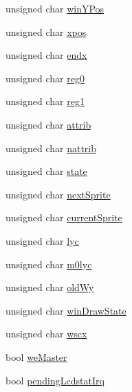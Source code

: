 \begin{DoxyCompactItemize}
unsigned char \hyperlink{structgambatte_1_1SaveState_1_1PPU_abbc3b3a5d9961bcff5f1c58cb11099c7}{win\+Y\+Pos}
\item 
unsigned char \hyperlink{structgambatte_1_1SaveState_1_1PPU_a4cede5d88c31db884c02ec5547ae8ceb}{xpos}
\item 
unsigned char \hyperlink{structgambatte_1_1SaveState_1_1PPU_abe2c9145e622b8e99ff87ceedb8baeff}{endx}
\item 
unsigned char \hyperlink{structgambatte_1_1SaveState_1_1PPU_a84648df39d301ca942bc50a36dfe1dd3}{reg0}
\item 
unsigned char \hyperlink{structgambatte_1_1SaveState_1_1PPU_a8bd8169b9a763c17bd15c3c9c5866f0c}{reg1}
\item 
unsigned char \hyperlink{structgambatte_1_1SaveState_1_1PPU_a500021f50efc515f9bbf7cabd0a77a6b}{attrib}
\item 
unsigned char \hyperlink{structgambatte_1_1SaveState_1_1PPU_a8b27a2b9ab5953c02ba735ff5d7f197a}{nattrib}
\item 
unsigned char \hyperlink{structgambatte_1_1SaveState_1_1PPU_a2ad525914659c6e55440272352d20355}{state}
\item 
unsigned char \hyperlink{structgambatte_1_1SaveState_1_1PPU_a0188cf3be86c6b4338fcfea215089374}{next\+Sprite}
\item 
unsigned char \hyperlink{structgambatte_1_1SaveState_1_1PPU_a2a76d262159b270c5a3359bd8bef8fb3}{current\+Sprite}
\item 
unsigned char \hyperlink{structgambatte_1_1SaveState_1_1PPU_acb7f03d9e87fb73d89688ea2d8789abe}{lyc}
\item 
unsigned char \hyperlink{structgambatte_1_1SaveState_1_1PPU_a25f14433cb1ac9997c84af8fbfb51962}{m0lyc}
\item 
unsigned char \hyperlink{structgambatte_1_1SaveState_1_1PPU_a46bc471457cfdef2e53a362fb9929bf5}{old\+Wy}
\item 
unsigned char \hyperlink{structgambatte_1_1SaveState_1_1PPU_a465e410d70f2de41d140d313cfd9f5ac}{win\+Draw\+State}
\item 
unsigned char \hyperlink{structgambatte_1_1SaveState_1_1PPU_a28a408a0782d051ae7e298ea298112e3}{wscx}
\item 
bool \hyperlink{structgambatte_1_1SaveState_1_1PPU_a21367dcad642b246d4ffc41d1aed912c}{we\+Master}
\item 
bool \hyperlink{structgambatte_1_1SaveState_1_1PPU_af5cdde1c516c00f63d2eb4f0b1cb6040}{pending\+Lcdstat\+Irq}
\end{DoxyCompactItemize}


